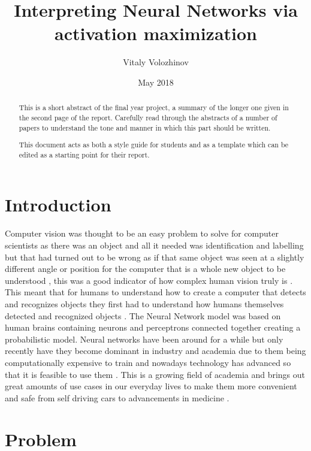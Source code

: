 \documentclass{csfyp}
\title{Interpreting Neural Networks via activation maximization}
\author{Vitaly Volozhinov}
\date{May 2018}
\begin{document}
\tableofcontents

\maketitle

\setcounter{page}{1}


\begin{abstract}
This is a short abstract of the final year project, a summary of the longer one given in the second page of the report. Carefully read through the abstracts of a number of papers to understand the tone and manner in which this part should be written.

This document acts as both a style guide for students and as a template which can be edited as a starting point for their report.
\end{abstract}

\section{Introduction}
\label{s:intro}

Computer vision was thought to be an easy problem to solve for computer scientists as there was an object and all it needed was identification and labelling but that had turned out to be wrong as if that same object was seen at a slightly different angle or position for the computer that is a whole new object to be understood , this was a good indicator of how complex human vision truly is . This meant that for humans to understand how to create a computer that detects and recognizes objects they first had to understand how humans themselves detected and recognized objects . The Neural Network model was based on human brains containing neurons and perceptrons connected together creating a probabilistic model. Neural networks have been around for a while but only recently have they become dominant in industry and academia due to them being computationally expensive to train and nowadays technology has advanced so that it is feasible to use them .
This is a growing field of academia and brings out great amounts of use cases in our everyday lives to make them more convenient and safe from self driving cars to advancements in medicine . 

\section{Problem}
\end{document}
